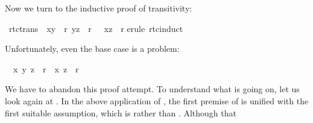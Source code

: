 \begin{isabellebody}
\begin{isamarkuptext}
Now we turn to the inductive proof of transitivity:%
\end{isamarkuptext}%
\isamarkuptrue%
\isamarkupfalse%
\ rtc{}trans{}\ {}{}\ {}x{}y{}\ {}\ r{}{}\ {}y{}z{}\ {}\ r{}\ {}\ {}\ {}x{}z{}\ {}\ r{}{}\isanewline
%
\isadelimproof
%
\endisadelimproof
%
\isatagproof
{}\isamarkupfalse%
{}erule\ rtc{}induct{}%
\begin{isamarkuptxt}%
\noindent
Unfortunately, even the base case is a problem:
\begin{isabelle}%
\ {}{}\ {}x{}\ {}y{}\ z{}\ {}\ r{}\ {}\ {}x{}\ z{}\ {}\ r{}%
\end{isabelle}
We have to abandon this proof attempt.
To understand what is going on, let us look again at .
In the above application of , the first premise of
 is unified with the first suitable assumption, which
is  rather than . Although that

\end{isamarkuptxt}
\end{isabellebody}
